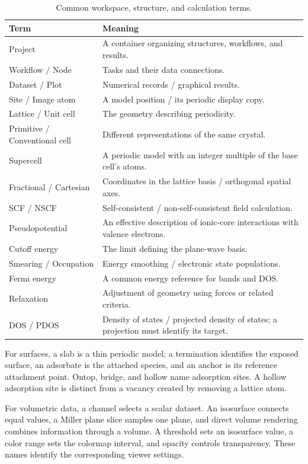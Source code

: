 \begin{table}[H]
\centering
\caption{Common workspace, structure, and calculation terms.}
\begin{tabularx}{\linewidth}{lX}
\toprule
Term & Meaning \\
\midrule
Project & A container organizing structures, workflows, and results.\\
Workflow / Node & Tasks and their data connections.\\
Dataset / Plot & Numerical records / graphical results.\\
Site / Image atom & A model position / its periodic display copy.\\
Lattice / Unit cell & The geometry describing periodicity.\\
Primitive / Conventional cell & Different representations of the same crystal.\\
Supercell & A periodic model with an integer multiple of the base cell's atoms.\\
Fractional / Cartesian & Coordinates in the lattice basis / orthogonal spatial axes.\\
SCF / NSCF & Self-consistent / non-self-consistent field calculation.\\
Pseudopotential & An effective description of ionic-core interactions with valence electrons.\\
Cutoff energy & The limit defining the plane-wave basis.\\
Smearing / Occupation & Energy smoothing / electronic state populations.\\
Fermi energy & A common energy reference for bands and DOS.\\
Relaxation & Adjustment of geometry using forces or related criteria.\\
DOS / PDOS & Density of states / projected density of states; a projection must identify its target.\\
\bottomrule
\end{tabularx}
\end{table}

For surfaces, a slab is a thin periodic model; a termination identifies the exposed surface, an adsorbate is the attached species, and an anchor is its reference attachment point. Ontop, bridge, and hollow name adsorption sites. A hollow adsorption site is distinct from a vacancy created by removing a lattice atom.

For volumetric data, a channel selects a scalar dataset. An isosurface connects equal values, a Miller plane slice samples one plane, and direct volume rendering combines information through a volume. A threshold sets an isosurface value, a color range sets the colormap interval, and opacity controls transparency. These names identify the corresponding viewer settings.

